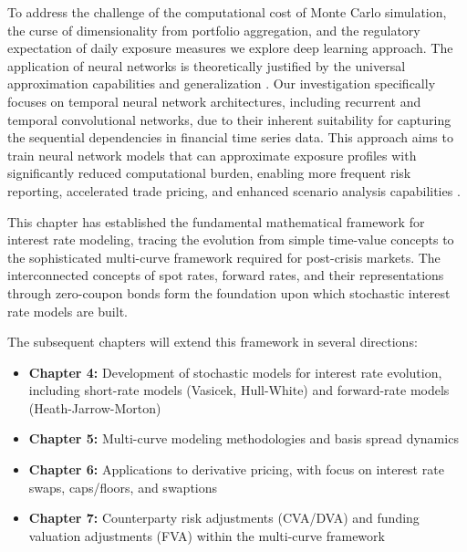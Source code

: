 \noindent
    To address the challenge of the computational cost of Monte Carlo simulation, the curse of dimensionality from portfolio aggregation, and the regulatory expectation of daily exposure measures we explore deep learning approach. The application of neural networks is theoretically justified by the universal approximation capabilities and generalization \cite{Goodfellow-et-al-2016}. Our investigation specifically focuses on temporal neural network architectures, including recurrent and temporal convolutional networks, due to their inherent suitability for capturing the sequential dependencies in financial time series data. This approach aims to train neural network models that can approximate exposure profiles with significantly reduced computational burden, enabling more frequent risk reporting, accelerated trade pricing, and enhanced scenario analysis capabilities \cite{frode2022neural}. \\

\noindent

       This chapter has established the fundamental mathematical framework for interest rate modeling, tracing the evolution from simple time-value concepts to the sophisticated multi-curve framework required for post-crisis markets. The interconnected concepts of spot rates, forward rates, and their representations through zero-coupon bonds form the foundation upon which stochastic interest rate models are built.
    
    The subsequent chapters will extend this framework in several directions:
    \begin{itemize}
        \item \textbf{Chapter 4:} Development of stochastic models for interest rate evolution, including short-rate models (Vasicek, Hull-White) and forward-rate models (Heath-Jarrow-Morton)
        \item \textbf{Chapter 5:} Multi-curve modeling methodologies and basis spread dynamics
        \item \textbf{Chapter 6:} Applications to derivative pricing, with focus on interest rate swaps, caps/floors, and swaptions
        \item \textbf{Chapter 7:} Counterparty risk adjustments (CVA/DVA) and funding valuation adjustments (FVA) within the multi-curve framework
    \end{itemize}
    
